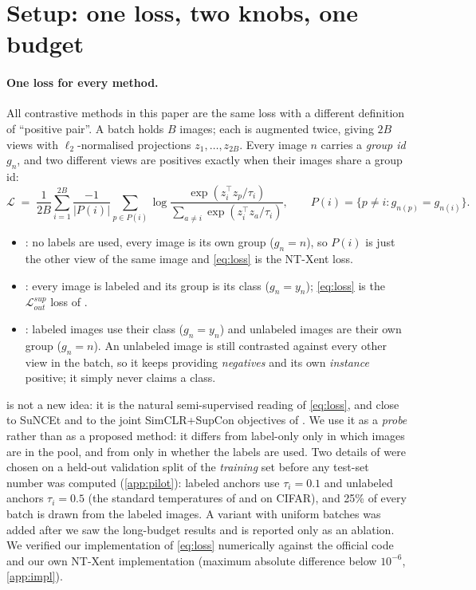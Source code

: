\section{Setup: one loss, two knobs, one budget}
\label{sec:setup}

\paragraph{One loss for every method.}
All contrastive methods in this paper are the same loss with a different definition of ``positive pair''.
A batch holds $B$ images; each is augmented twice, giving $2B$ views with $\ell_2$-normalised
projections $z_1,\dots,z_{2B}$. Every image $n$ carries a \emph{group id} $g_n$, and two different views are
positives exactly when their images share a group id:
\begin{equation}
\label{eq:loss}
\mathcal{L} \;=\; \frac{1}{2B}\sum_{i=1}^{2B} \frac{-1}{|P(i)|}\sum_{p\in P(i)}
\log\frac{\exp(z_i^\top z_p/\tau_i)}{\sum_{a\neq i}\exp(z_i^\top z_a/\tau_i)},
\qquad P(i)=\{p\neq i : g_{n(p)} = g_{n(i)}\}.
\end{equation}
\begin{itemize}
\item \textbf{\simclr} \citep{chen2020simclr}: no labels are used, every image is its own group ($g_n = n$), so
$P(i)$ is just the other view of the same image and \cref{eq:loss} is the NT-Xent loss.
\item \textbf{\supcon} \citep{khosla2020supcon}: every image is labeled and its group is its class
($g_n = y_n$); \cref{eq:loss} is the $\mathcal{L}^{sup}_{out}$ loss of \citet{khosla2020supcon}.
\item \textbf{\union}: labeled images use their class ($g_n=y_n$) and unlabeled images are their own group
($g_n = n$). An unlabeled image is still contrasted against every other view in the batch, so it keeps
providing \emph{negatives} and its own \emph{instance} positive; it simply never claims a class.
\end{itemize}
\union is not a new idea: it is the natural semi-supervised reading of \cref{eq:loss}, and close to
SuNCEt \citep{assran2020suncet} and to the joint SimCLR+SupCon objectives of \citet{islam2021broad}.
We use it as a \emph{probe} rather than as a proposed method: it differs from label-only \supcon only in
which images are in the pool, and from \simclr only in whether the labels are used. Two details of \union were chosen on a held-out
validation split of the \emph{training} set before any test-set number was computed (\cref{app:pilot}):
labeled anchors use $\tau_i=0.1$ and unlabeled anchors $\tau_i=0.5$ (the standard temperatures of
\supcon and \simclr on CIFAR), and 25\% of every batch is drawn from the labeled images. A variant with uniform batches was added after we saw the long-budget results and is reported only as an ablation.
We verified our implementation of \cref{eq:loss} numerically against the official \supcon code and our own
NT-Xent implementation (maximum absolute difference below $10^{-6}$, \cref{app:impl}).

